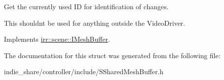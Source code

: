 Get the currently used ID for identification of changes. 

This shouldn\textquotesingle{}t be used for anything outside the Video\+Driver. 

Implements \hyperlink{classirr_1_1scene_1_1IMeshBuffer_aba48df31edf92a0117692c0be02298db}{irr\+::scene\+::\+I\+Mesh\+Buffer}.



The documentation for this struct was generated from the following file\+:\begin{DoxyCompactItemize}
\item 
indie\+\_\+share/controller/include/S\+Shared\+Mesh\+Buffer.\+h\end{DoxyCompactItemize}
